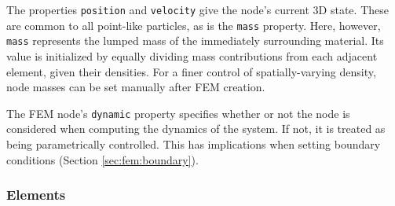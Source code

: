 The properties {\tt position} and {\tt velocity} give the node's current
3D state.  These are common to all point-like particles, as is the 
{\tt mass} property.  Here, however, {\tt mass} represents the lumped mass
of the immediately surrounding material.  Its value is initialized by equally
dividing mass contributions from each adjacent element, given their
densities.  For a finer control of spatially-varying density,
node masses can be set manually after FEM creation.

The FEM node's {\tt dynamic} property specifies whether or not the 
node is considered when computing the dynamics of the system.  If not,
it is treated as being parametrically controlled.  This has implications
when setting boundary conditions (Section \ref{sec:fem:boundary}).

\subsubsection{Elements}
\ifLaTeXML{\newline}

